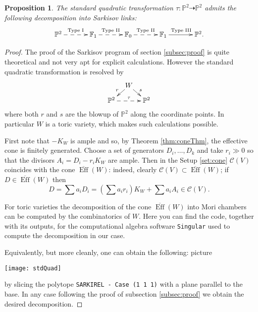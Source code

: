 \documentclass[a4paper,11pt]{amsart}
\newtheorem{proposition}[theorem]{Proposition}
\def\Eff{\operatorname{Eff}}
\newcommand{\Cc}{\mathcal{C}}
\newcommand{\PP}{\mathbb{P}}
\renewcommand{\FF}{\mathbb{F}}
\newcommand{\rmap}{\dashrightarrow}
\begin{document}
\begin{proposition}
	The standard quadratic transformation $\tau\colon \PP^2 \rmap \PP^2$ admits the following decomposition into Sarkisov links:
	\[
	\xymatrix@C=1.2cm{
	\PP^2 \ar@{-->}[r]^{\text{Type I}} &\FF_1 \ar@{-->}[r]^{\text{Type II}} &\FF_0  \ar@{-->}[r]^{\text{Type II}} & \FF_1 \ar[r]^{\text{Type III}} &\PP^2.
	}
	\]
\end{proposition}

\begin{proof}
	The proof of the Sarkisov program of section \ref{subsec:proof} is quite theoretical and not very apt for explicit calculations.
	However the standard quadratic transformation is resolved by 
	\[
	\xymatrix@R=.3cm@C=.3cm{
	& W \ar[ld]_r \ar[rd]^s\\
	\PP^2 \ar@{-->}[rr]^{\tau} && \PP^2
	}
	\]
	where both $r$ and $s$ are the blowup of $\PP^2$ along the coordinate points.
	In particular $W$ is a toric variety, which makes such calculations possible.
	
	First note that $-K_W$ is ample and so, by Theorem \ref{thm:coneThm}, the effective cone is finitely generated.
	Choose a set of generators $D_i, \dots, D_k$ and take $r_i \gg 0$ so that the divisors $A_i = D_i - r_iK_W$ are ample.
	Then in the Setup \ref{set:cone} $\Cc(V)$ coincides with the cone $\overline{\Eff}(W)$: indeed, clearly $\Cc(V) \subset \overline{\Eff}(W)$;
	if $D \in \overline{\Eff}(W)$ then 
	\[
	D = \sum a_iD_i = \left(\sum a_ir_i\right)K_W + \sum a_iA_i \in \Cc(V).
	\]
	
	For toric varieties the decomposition of the cone $\overline{\Eff}(W)$ into Mori chambers can be computed by the combinatorics of $W$.
	Here 	\href{https://s-zikas.github.io/site/teaching/surfacesAndSarkisov/singularCode-DecompositionOfStadQuadratic.txt}{\small \faExternalLink} you can find the code, together with its outputs, for the computational algebra software \texttt{Singular} \href{https://www.singular.uni-kl.de/index.php/singular-manual.html}{\small \faExternalLink} used to compute the decomposition in our case.
	
	Equivalently, but more cleanly, one can obtain the following: picture	
\begin{center}
	\texttt{[image: stdQuad]}
\end{center}
	by slicing the polytope \texttt{SARKIREL - Case (1 1 1)} \href{https://www.math.univ-toulouse.fr/~slamy/sarkirel/sarkirel_interactive.html}{\small \faExternalLink} with a plane parallel to the base.
	In any case following the proof of subsection \ref{subsec:proof} we obtain the desired decomposition.
\end{proof}
\end{document}
